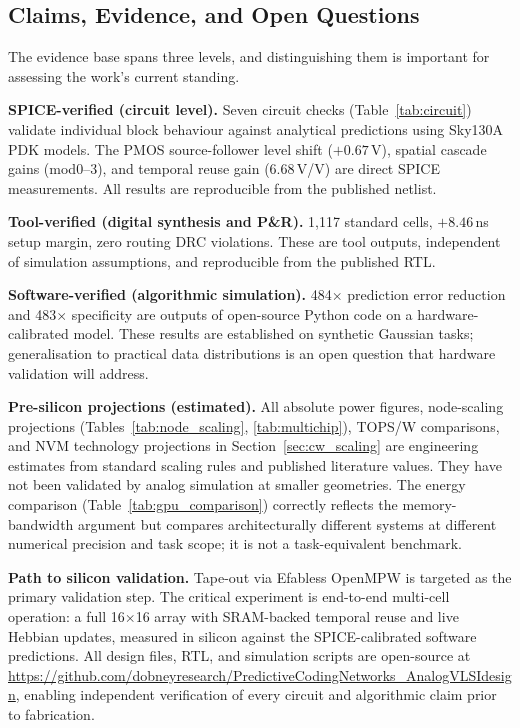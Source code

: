 \documentclass[journal,10pt,twoside]{IEEEtran}
\begin{document}
\subsection{Claims, Evidence, and Open Questions}
\label{sec:validation}

The evidence base spans three levels, and distinguishing them is important
for assessing the work's current standing.

\textbf{SPICE-verified (circuit level).}
Seven circuit checks (Table~\ref{tab:circuit}) validate individual block
behaviour against analytical predictions using Sky130A PDK models.
The PMOS source-follower level shift ($+0.67$\,V), spatial cascade gains
(mod0--3), and temporal reuse gain (6.68\,V/V) are direct SPICE measurements.
All results are reproducible from the published netlist.

\textbf{Tool-verified (digital synthesis and P\&R).}
1,117 standard cells, $+8.46$\,ns setup margin, zero routing DRC violations.
These are tool outputs, independent of simulation assumptions, and
reproducible from the published RTL.

\textbf{Software-verified (algorithmic simulation).}
484$\times$ prediction error reduction and 483$\times$ specificity are
outputs of open-source Python code on a hardware-calibrated model.
These results are established on synthetic Gaussian tasks;
generalisation to practical data distributions is an open question
that hardware validation will address.

\textbf{Pre-silicon projections (estimated).}
All absolute power figures, node-scaling projections (Tables~\ref{tab:node_scaling},
\ref{tab:multichip}), TOPS/W comparisons, and NVM technology projections
in Section~\ref{sec:cw_scaling} are engineering estimates from
standard scaling rules and published literature values.
They have not been validated by analog simulation at smaller geometries.
The energy comparison (Table~\ref{tab:gpu_comparison}) correctly reflects
the memory-bandwidth argument but compares architecturally different systems
at different numerical precision and task scope; it is not a
task-equivalent benchmark.

\textbf{Path to silicon validation.}
Tape-out via Efabless OpenMPW is targeted as the primary validation step.
The critical experiment is end-to-end multi-cell operation: a full
16$\times$16 array with SRAM-backed temporal reuse and live Hebbian updates,
measured in silicon against the SPICE-calibrated software predictions.
All design files, RTL, and simulation scripts are open-source at
\url{https://github.com/dobneyresearch/PredictiveCodingNetworks_AnalogVLSIdesign},
enabling independent verification of every circuit and algorithmic claim
prior to fabrication.
\end{document}
